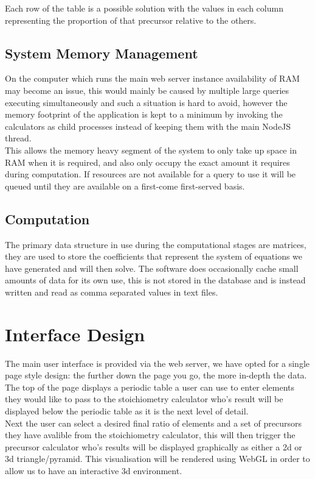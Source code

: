 Each row of the table is a possible solution with the values in each column representing the proportion of that precursor relative to the others.

\subsection{System Memory Management}
On the computer which runs the main web server instance availability of RAM may become an issue, this would mainly be caused by multiple large queries executing simultaneously and such a situation is hard to avoid, however the memory footprint of the application is kept to a minimum by invoking the calculators as child processes instead of keeping them with the main NodeJS thread.\\

This allows the memory heavy segment of the system to only take up space in RAM when it is required, and also only occupy the exact amount it requires during computation. If resources are not available for a query to use it will be queued until they are available on a first-come first-served basis. 

\subsection{Computation}
The primary data structure in use during the computational stages are matrices, they are used to store the coefficients that represent the system of equations we have generated and will then solve. The software does occasionally cache small amounts of data for its own use, this is not stored in the database and is instead written and read as comma separated values in text files.


\section{Interface Design}
The main user interface is provided via the web server, we have opted for a single page style design: the further down the page you go, the more in-depth the data. \\

The top of the page displays a periodic table a user can use to enter elements they would like to pass to the stoichiometry calculator who's result will be displayed below the periodic table as it is the next level of detail.\\

Next the user can select a desired final ratio of elements and a set of precursors they have avalible from the stoichiometry calculator, this will then trigger the precursor calculator who's results will be displayed graphically as either a 2d or 3d triangle/pyramid. This visualisation will be rendered using WebGL in order to allow us to have an interactive 3d environment. \\


